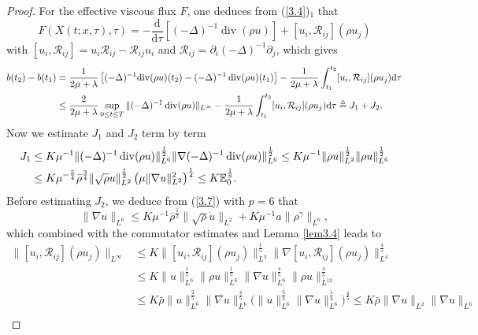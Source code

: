\documentclass[11pt]{article}
\DeclareMathOperator{\divv}{div}
\begin{document}
\begin{proof}
For the effective viscous flux $F$, one deduces from (\ref{3.4})$_1$ that
$$
F \left(X (t;x,\tau),\tau \right) = - \frac{\mathrm{d}}{\mathrm{d}
\tau} \left[(- \Delta)^{-1} \divv (\rho u) \right] + [u_i,\mathcal{R}_{ij} ] (\rho u_j)
$$
with $[u_i, \mathcal{R}_{ij}] = u_i \mathcal{R}_{ij} - \mathcal{R}_{ij} u_i$ and $\mathcal{R}_{ij} = \partial_i \left(- \Delta\right)^{-1} \partial_j$, which gives
\begin{align}
b(t_2) - b(t_1)
& = \frac{1}{2 \mu + \lambda } \left[(- \Delta)^{-1} \mathrm{div} (\rho u) (t_2) - (- \Delta)^{-1} \divv (\rho u) (t_1) \right] - \frac{1}{2 \mu + \lambda } \int^{t_2}_{t_1} [u_i,\mathcal{R}_{ij} ] (\rho u_j) \mathrm{d} \tau \notag\\
& \leq \frac{2}{2 \mu + \lambda } \sup_{0 \leq t \leq T} \| (- \Delta)^{-1} \divv (\rho u)\|_{L^{\infty }} - \frac{1}{2 \mu + \lambda } \int^{t_2}_{t_1} [u_i,\mathcal{R}_{ij} ] (\rho u_j) \mathrm{d} \tau \triangleq J_1 + J_2.\label{4.8}
\end{align}
Now we estimate $J_1$ and $J_2$ term by term
\begin{align}\label{4.9}
J_1
& \leq K \mu^{-1} \|(-\Delta)^{-1} \divv (\rho u)\|_{L^6}^{\frac{1}{2}} \|\nabla (-\Delta)^{-1} \divv (\rho u)\|_{L^6}^{\frac{1}{2}} \leq K \mu^{-1} \|\rho u\|_{L^2}^{\frac{1}{2}} \|\rho u\|_{L^6}^{\frac{1}{2}}\notag \\
& \leq K \mu^{- \frac{5}{4}} \bar{\rho}^{\frac{3}{4}} \|\sqrt \rho u\|_{L^2}^{\frac{1}{2}} \left( \mu \|\nabla u\|_{L^2}^2 \right)^{\frac{1}{4}} \leq K \mathbb{E}_0^{\frac{1}{8}}.
\end{align}
Before estimating $J_2$, we deduce from (\ref{3.7}) with $p = 6$ that
$$
\|\nabla u\|_{L^6}
\leq K \mu^{-1} \bar{\rho}^{\frac{1}{2}} \|\sqrt{\rho} \dot{u}\|_{L^2} + K \mu^{-1} a \|\rho^{\gamma}\|_{L^6},
$$
which combined with  the commutator estimates and Lemma \ref{lem3.4} leads to
$$
\begin{aligned}
\|[u_i,\mathcal{R}_{ij} ] (\rho u_j)\|_{L^\infty }
& \leq K \|[u_i,\mathcal{R}_{ij} ] (\rho u_j)\|_{L^3}^{\frac{1}{5}} \|\nabla [u_i,\mathcal{R}_{ij} ] (\rho u_j)\|_{L^4}^{\frac{4}{5}}\\
& \leq K \|u\|_{L^6}^{\frac{1}{5}} \|\rho u\|_{L^6}^{\frac{1}{5}} \|\nabla u\|_{L^6}^{\frac{4}{5}} \|\rho u\|_{L^{12}}^{\frac{4}{5}}\\
& \leq K \bar{\rho} \|u\|_{L^6}^{\frac{2}{5}} \|\nabla u\|_{L^6}^{\frac{4}{5}} \Big( \|u\|_{L^6}^{\frac{3}{4}} \|\nabla u\|_{L^6}^{\frac{1}{4}}\Big)^{\frac{4}{5}} \leq K \bar{\rho} \|\nabla u\|_{L^2} \|\nabla u\|_{L^6}\\

\end{aligned}$$
\end{proof}
\end{document}
